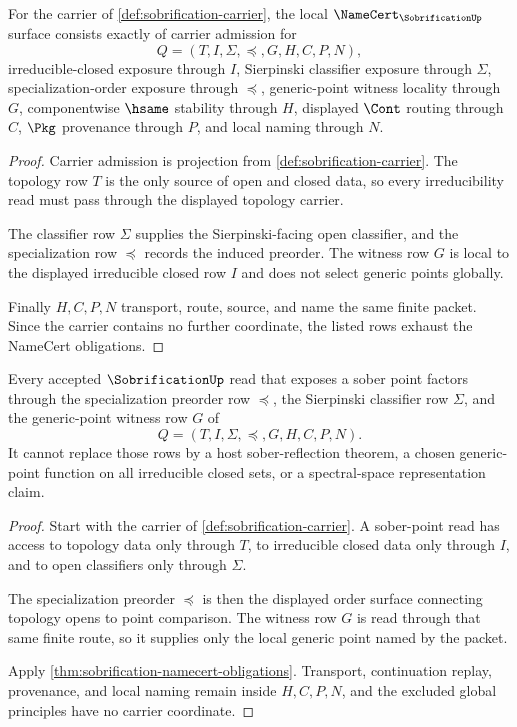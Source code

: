 \begin{theorem}
\label{thm:sobrification-namecert-obligations}
For the carrier of \autoref{def:sobrification-carrier}, the local $\NameCert_{\SobrificationUp}$ surface consists exactly of carrier admission for
$$
Q=(T,I,\Sigma,\preceq,G,H,C,P,N),
$$
irreducible-closed exposure through $I$, Sierpinski classifier exposure through $\Sigma$, specialization-order exposure through $\preceq$, generic-point witness locality through $G$, componentwise $\hsame$ stability through $H$, displayed $\Cont$ routing through $C$, $\Pkg$ provenance through $P$, and local naming through $N$.
\end{theorem}
\begin{proof}
Carrier admission is projection from \autoref{def:sobrification-carrier}. The topology row $T$ is the only source of open and closed data, so every irreducibility read must pass through the displayed topology carrier.

The classifier row $\Sigma$ supplies the Sierpinski-facing open classifier, and the specialization row $\preceq$ records the induced preorder. The witness row $G$ is local to the displayed irreducible closed row $I$ and does not select generic points globally.

Finally $H,C,P,N$ transport, route, source, and name the same finite packet. Since the carrier contains no further coordinate, the listed rows exhaust the NameCert obligations.
\end{proof}

\begin{theorem}
\label{thm:sobrification-specialization-sober-point-surface}
Every accepted $\SobrificationUp$ read that exposes a sober point factors through the specialization preorder row $\preceq$, the Sierpinski classifier row $\Sigma$, and the generic-point witness row $G$ of
$$
Q=(T,I,\Sigma,\preceq,G,H,C,P,N).
$$
It cannot replace those rows by a host sober-reflection theorem, a chosen generic-point function on all irreducible closed sets, or a spectral-space representation claim.
\end{theorem}
\begin{proof}
Start with the carrier of \autoref{def:sobrification-carrier}. A sober-point read has access to topology data only through $T$, to irreducible closed data only through $I$, and to open classifiers only through $\Sigma$.

The specialization preorder $\preceq$ is then the displayed order surface connecting topology opens to point comparison. The witness row $G$ is read through that same finite route, so it supplies only the local generic point named by the packet.

Apply \autoref{thm:sobrification-namecert-obligations}. Transport, continuation replay, provenance, and local naming remain inside $H,C,P,N$, and the excluded global principles have no carrier coordinate.
\end{proof}

